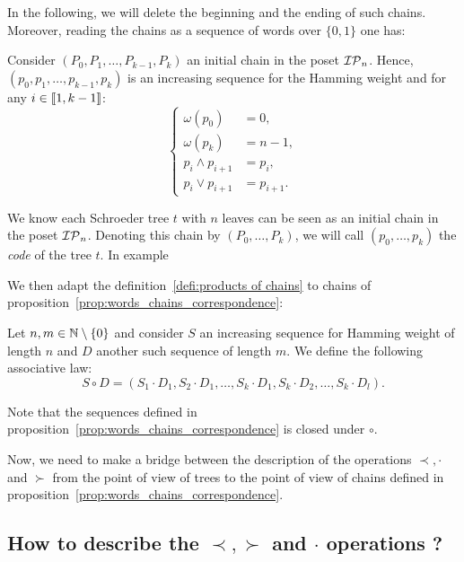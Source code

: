In the following, we will delete the beginning and the ending of such chains. Moreover, reading the chains as a sequence of words over $\{0,1\}$ one has:
\begin{Prop}\label{prop:words_chains_correspondence}
	Consider $(P_0,P_1,\dots, P_{k-1},P_k)$ an initial chain in the poset $\mathcal{IP}_{n}$. Hence, $(p_0,p_1,\dots,p_{k-1},p_k)$ is an increasing sequence for the Hamming weight and for any $i\in\llbracket 1,k-1 \rrbracket$:
	\[
	\begin{cases}
		\omega(p_0)&=0, \\
		\omega(p_k)&=n-1, \\
		p_i \land p_{i+1}&=p_i, \\
		p_i \lor p_{i+1}&=p_{i+1}.
	\end{cases}
	\]
\end{Prop}
\begin{Rq}
	We know each Schroeder tree $t$ with $n$ leaves can be seen as an initial chain in the poset $\mathcal{IP}_{n}$. Denoting this chain by $(P_0,\dots,P_k)$, we will call $(p_0,\dots,p_k)$ the \emph{code} of the tree $t$.
	In example
\end{Rq}

We then adapt the definition~\ref{defi:products of chains} to chains of proposition~\ref{prop:words_chains_correspondence}:
\begin{defi}
		Let $n,m\in\mathbb{N}\setminus\{0\}$ and consider $S$ an increasing sequence for Hamming weight of length $n$ and $D$ another such sequence of length $m$.
		We define the following associative law:
	\begin{equation}
		S\circ D=\left( S_1\cdot D_1,S_2\cdot D_1,\dots, S_k\cdot D_1,S_k\cdot D_2,\dots,S_k\cdot D_l\right).
	\end{equation}
\end{defi}
\begin{Rq}
	Note that the sequences defined in proposition~\ref{prop:words_chains_correspondence} is closed under $\circ$.
\end{Rq}

Now, we need to make a bridge between the description of the operations $\prec,\cdot$ and $\succ$ from the point of view of trees to the point of view of chains defined in proposition~\ref{prop:words_chains_correspondence}.

\subsection{How to describe the $\prec, \succ$ and $\cdot$ operations ?}

